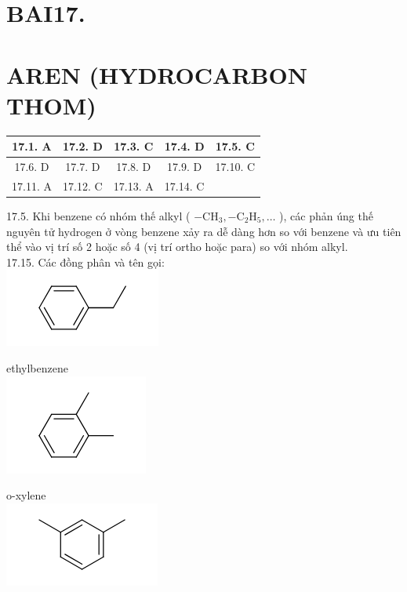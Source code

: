 \documentclass[10pt]{article}
\begin{document}
\section*{BAI17.}
\section*{AREN (HYDROCARBON THOM)}
\begin{center}
\begin{tabular}{|c|c|c|c|c|}
\hline
17.1. A & 17.2. D & 17.3. C & 17.4. D & 17.5. C \\
\hline
17.6. D & 17.7. D & 17.8. D & 17.9. D & 17.10. C \\
\hline
17.11. A & 17.12. C & 17.13. A & 17.14. C &  \\
\hline
\end{tabular}
\end{center}

17.5. Khi benzene có nhóm thế alkyl ( $-\mathrm{CH}_{3},-\mathrm{C}_{2} \mathrm{H}_{5}, \ldots$ ), các phản úng thế nguyên tử hydrogen ở vòng benzene xảy ra dễ dàng hơn so với benzene và ưu tiên thể vào vị trí số 2 hoặc số 4 (vị trí ortho hoặc para) so với nhóm alkyl.\\
17.15. Các đồng phân và tên gọi:\\
\includegraphics{smile-7b20fa2c6094ebc9edaac2291b6dd9a41d95271f}

ethylbenzene\\
\includegraphics{smile-ada42d2954463b021724bfce25bf6f15ae852efd}

o-xylene\\
\includegraphics{smile-907fc6a2d8a44cd774d6e7ad1f4231b9b516bfab}
\end{document}
